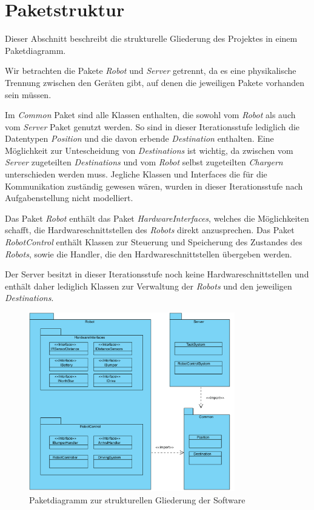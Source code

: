 \section{Paketstruktur}
Dieser Abschnitt beschreibt die strukturelle Gliederung des Projektes in einem Paketdiagramm.

Wir betrachten die Pakete \textit{Robot} und \textit{Server} getrennt, da es eine physikalische Trennung zwischen den Geräten gibt, auf denen die jeweiligen Pakete vorhanden sein müssen.

Im \textit{Common} Paket sind alle Klassen enthalten, die sowohl vom \textit{Robot} als auch vom \textit{Server} Paket genutzt werden. So sind in dieser Iterationsstufe lediglich die Datentypen \textit{Position} und die davon erbende \textit{Destination} enthalten. Eine Möglichkeit zur Untescheidung von \textit{Destinations} ist wichtig, da zwischen vom \textit{Server} zugeteilten \textit{Destinations} und vom \textit{Robot} selbst zugeteilten \textit{Chargern} unterschieden werden muss. Jegliche Klassen und Interfaces die für die Kommunikation zuständig gewesen wären, wurden in dieser Iterationsstufe nach Aufgabenstellung nicht modelliert.

Das Paket \textit{Robot} enthält das Paket \textit{HardwareInterfaces}, welches die Möglichkeiten schafft, die Hardwareschnittstellen des \textit{Robots} direkt anzusprechen. Das Paket \textit{RobotControl} enthält Klassen zur Steuerung und Speicherung des Zustandes des \textit{Robots}, sowie die Handler, die den Hardwareschnittstellen übergeben werden.

Der Server besitzt in dieser Iterationsstufe noch keine Hardwareschnittstellen und enthält daher lediglich Klassen zur Verwaltung der \textit{Robots} und den jeweiligen \textit{Destinations}.


\begin{figure}[H]
\centering
\includegraphics[width=0.8\textwidth]{../images/Iteration0_Entwurf_6_Paketdiagramm}
\caption{Paketdiagramm zur strukturellen Gliederung der Software}
\label{Paketstruktur}
\end{figure}